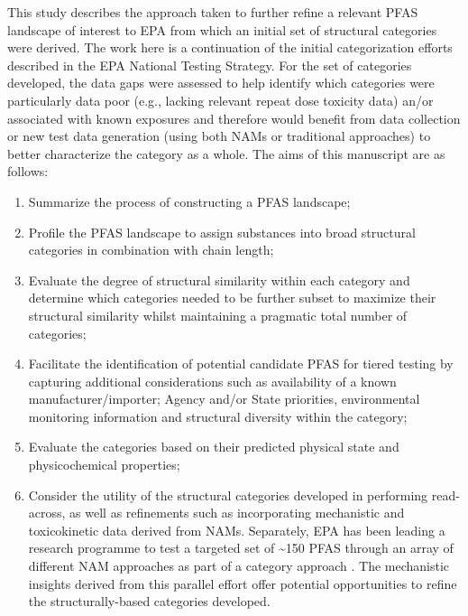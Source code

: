 \documentclass[
  super,
  preprint,
  3p]{elsarticle}
\providecommand{\tightlist}{%
  \setlength{\itemsep}{0pt}\setlength{\parskip}{0pt}}\usepackage{longtable,booktabs,array}
\begin{document}
This study describes the approach taken to further refine a relevant
PFAS landscape of interest to EPA from which an initial set of
structural categories were derived. The work here is a continuation of
the initial categorization efforts described in the EPA National Testing
Strategy. For the set of categories developed, the data gaps were
assessed to help identify which categories were particularly data poor
(e.g., lacking relevant repeat dose toxicity data) an/or associated with
known exposures and therefore would benefit from data collection or new
test data generation (using both NAMs or traditional approaches) to
better characterize the category as a whole. The aims of this manuscript
are as follows:

\begin{enumerate}
\def\labelenumi{\arabic{enumi}.}
\tightlist
\item
  Summarize the process of constructing a PFAS landscape;
\item
  Profile the PFAS landscape to assign substances into broad structural
  categories in combination with chain length;
\item
  Evaluate the degree of structural similarity within each category and
  determine which categories needed to be further subset to maximize
  their structural similarity whilst maintaining a pragmatic total
  number of categories;
\item
  Facilitate the identification of potential candidate PFAS for tiered
  testing by capturing additional considerations such as availability of
  a known manufacturer/importer; Agency and/or State priorities,
  environmental monitoring information and structural diversity within
  the category;
\item
  Evaluate the categories based on their predicted physical state and
  physicochemical properties;
\item
  Consider the utility of the structural categories developed in
  performing read-across, as well as refinements such as incorporating
  mechanistic and toxicokinetic data derived from NAMs. Separately, EPA
  has been leading a research programme to test a targeted set of
  \textasciitilde150 PFAS through an array of different NAM approaches
  as part of a category approach
  \citep{carstens_evaluation_2023, houck_bioactivity_2021, houck_evaluation_2023, kreutz_category-based_2023, patlewicz_towards_2022, smeltz_plasma_2023, smeltz_targeted_2023, stoker_high-throughput_2023}.
  The mechanistic insights derived from this parallel effort offer
  potential opportunities to refine the structurally-based categories
  developed.
\end{enumerate}
\end{document}
